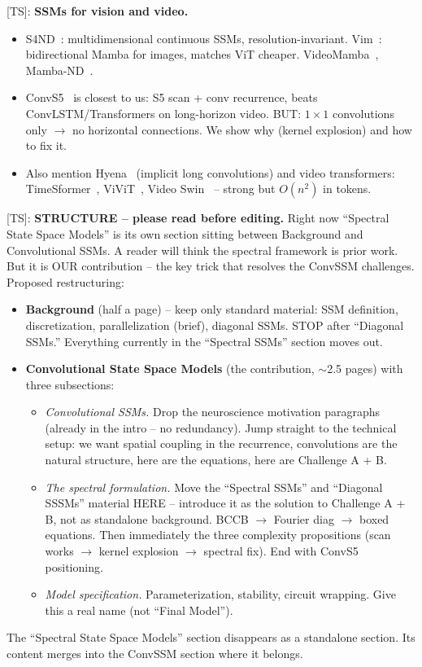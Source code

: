 \documentclass{article}
\newcommand{\TS}[1]{{\color{pink}[TS]: #1}}
\begin{document}
\TS{%
\textbf{SSMs for vision and video.}
\begin{itemize}
\item S4ND~\citep{nguyen2022}: multidimensional continuous SSMs, resolution-invariant. Vim~\citep{zhu2024}: bidirectional Mamba for images, matches ViT cheaper. VideoMamba~\citep{li2024videomamba}, Mamba-ND~\citep{li2024mamband}.
\item ConvS5~\citep{smith2023convs5} is closest to us: S5 scan + conv recurrence, beats ConvLSTM/Transformers on long-horizon video. BUT: $1\times 1$ convolutions only $\to$ no horizontal connections. We show why (kernel explosion) and how to fix it.
\item Also mention Hyena~\citep{poli2023} (implicit long convolutions) and video transformers: TimeSformer~\citep{bertasius2021}, ViViT~\citep{arnab2021}, Video Swin~\citep{liu2022swin} -- strong but $O(n^2)$ in tokens.
\end{itemize}}

\TS{\textbf{STRUCTURE -- please read before editing.} Right now ``Spectral State Space Models'' is its own section sitting between Background and Convolutional SSMs. A reader will think the spectral framework is prior work. But it is OUR contribution -- the key trick that resolves the ConvSSM challenges. Proposed restructuring:
%
\begin{itemize}
\item \textbf{Background} (half a page) -- keep only standard material: SSM definition, discretization, parallelization (brief), diagonal SSMs. STOP after ``Diagonal SSMs.'' Everything currently in the ``Spectral SSMs'' section moves out.
\item \textbf{Convolutional State Space Models} (the contribution, $\sim$2.5 pages) with three subsections:
  \begin{itemize}
  \item \emph{Convolutional SSMs.} Drop the neuroscience motivation paragraphs (already in the intro -- no redundancy). Jump straight to the technical setup: we want spatial coupling in the recurrence, convolutions are the natural structure, here are the equations, here are Challenge A + B.
  \item \emph{The spectral formulation.} Move the ``Spectral SSMs'' and ``Diagonal SSSMs'' material HERE -- introduce it as the solution to Challenge A + B, not as standalone background. BCCB $\to$ Fourier diag $\to$ boxed equations. Then immediately the three complexity propositions (scan works $\to$ kernel explosion $\to$ spectral fix). End with ConvS5 positioning.
  \item \emph{Model specification.} Parameterization, stability, circuit wrapping. Give this a real name (not ``Final Model'').
  \end{itemize}
\end{itemize}
%
The ``Spectral State Space Models'' section disappears as a standalone section. Its content merges into the ConvSSM section where it belongs.}
\end{document}
